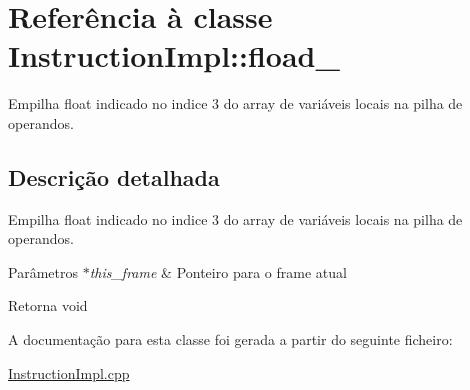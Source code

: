 \hypertarget{class_instruction_impl_1_1fload__3}{}\section{Referência à classe Instruction\+Impl\+:\+:fload\+\_}
\label{class_instruction_impl_1_1fload__3}


Empilha float indicado no indice 3 do array de variáveis locais na pilha de operandos.  




\subsection{Descrição detalhada}
Empilha float indicado no indice 3 do array de variáveis locais na pilha de operandos. 


\begin{DoxyParams}{Parâmetros}
{\em $\ast$this\+\_\+frame} & Ponteiro para o frame atual \\
\hline
\end{DoxyParams}
\begin{DoxyReturn}{Retorna}
void 
\end{DoxyReturn}


A documentação para esta classe foi gerada a partir do seguinte ficheiro\+:\begin{DoxyCompactItemize}
\item 
\hyperlink{_instruction_impl_8cpp}{Instruction\+Impl.\+cpp}\end{DoxyCompactItemize}
